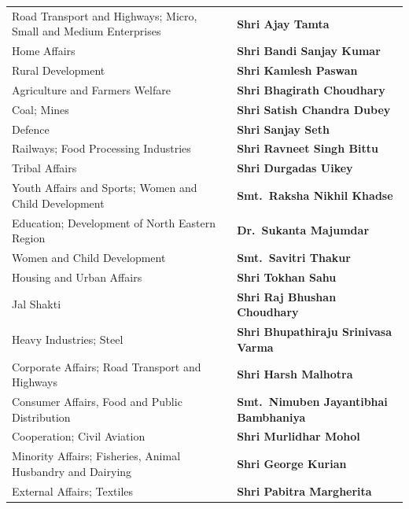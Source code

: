 \documentclass[12pt,a4paper,openany]{report}
\begin{document}
{\begin{longtable}{@{}>{\raggedright\arraybackslash}p{8.3cm} >{\raggedright\arraybackslash}p{7.1cm}@{}}
\addlinespace[2pt]
Road Transport and Highways; Micro, Small and Medium Enterprises & \textbf{Shri Ajay Tamta} \\
\addlinespace[2pt]
Home Affairs & \textbf{Shri Bandi Sanjay Kumar} \\
\addlinespace[2pt]
Rural Development & \textbf{Shri Kamlesh Paswan} \\
\addlinespace[2pt]
Agriculture and Farmers Welfare & \textbf{Shri Bhagirath Choudhary} \\
\addlinespace[2pt]
Coal; Mines & \textbf{Shri Satish Chandra Dubey} \\
\addlinespace[2pt]
Defence & \textbf{Shri Sanjay Seth} \\
\addlinespace[2pt]
Railways; Food Processing Industries & \textbf{Shri Ravneet Singh Bittu} \\
\addlinespace[2pt]
Tribal Affairs & \textbf{Shri Durgadas Uikey} \\
\addlinespace[2pt]
Youth Affairs and Sports; Women and Child Development & \textbf{Smt.\ Raksha Nikhil Khadse} \\
\addlinespace[2pt]
Education; Development of North Eastern Region & \textbf{Dr.\ Sukanta Majumdar} \\
\addlinespace[2pt]
Women and Child Development & \textbf{Smt.\ Savitri Thakur} \\
\addlinespace[2pt]
Housing and Urban Affairs & \textbf{Shri Tokhan Sahu} \\
\addlinespace[2pt]
Jal Shakti & \textbf{Shri Raj Bhushan Choudhary} \\
\addlinespace[2pt]
Heavy Industries; Steel & \textbf{Shri Bhupathiraju Srinivasa Varma} \\
\addlinespace[2pt]
Corporate Affairs; Road Transport and Highways & \textbf{Shri Harsh Malhotra} \\
\addlinespace[2pt]
Consumer Affairs, Food and Public Distribution & \textbf{Smt.\ Nimuben Jayantibhai Bambhaniya} \\
\addlinespace[2pt]
Cooperation; Civil Aviation & \textbf{Shri Murlidhar Mohol} \\
\addlinespace[2pt]
Minority Affairs; Fisheries, Animal Husbandry and Dairying & \textbf{Shri George Kurian} \\
\addlinespace[2pt]
External Affairs; Textiles & \textbf{Shri Pabitra Margherita} \\
\bottomrule
\end{longtable}}

\end{document}
